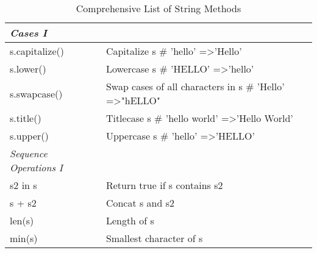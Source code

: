 \documentclass[a4paper,11pt]{book}
\numberwithin{figure}{chapter}
\numberwithin{table}{chapter}
\begin{document}
\begin{appendices}
\begin{table}[!htbp]
\centering
\caption{Comprehensive List of String Methods}
\label{tab:string_methods}
\begin{tabular}{lp{12cm}}
\toprule \toprule
\textit{Cases I}          &                                                                                                                                               \\ \midrule
s.capitalize()           & Capitalize s \# 'hello' =\textgreater 'Hello'                                                                                                   \\
s.lower()                & Lowercase s \# 'HELLO' =\textgreater 'hello'                                                                                                    \\
s.swapcase()             & Swap cases of all characters in s \# 'Hello' =\textgreater "hELLO"                                                                              \\
s.title()                & Titlecase s \# 'hello world' =\textgreater 'Hello World'                                                                                        \\
s.upper()                & Uppercase s \# 'hello' =\textgreater 'HELLO'                                                                                                    \\ \midrule
\textit{Sequence Operations I}    &                                                                                                                                                 \\ \midrule
s2 in s                  & Return true if s contains s2                                                                                                                    \\
s + s2                   & Concat s and s2                                                                                                                                 \\
len(s)                   & Length of s                                                                                                                                     \\
min(s)                   & Smallest character of s                                                                                                                         \\

\end{tabular}
\end{table}
\end{appendices}
\end{document}
